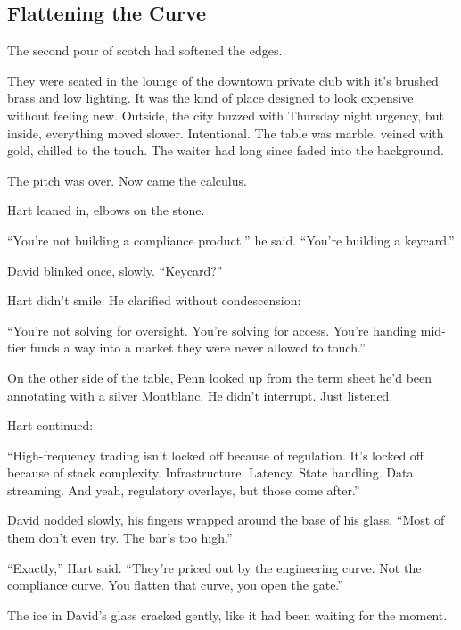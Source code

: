 
\subsection{Flattening the Curve}


The second pour of scotch had softened the edges.

They were seated in the lounge of the downtown private club with it's brushed brass and low lighting. It was the kind 
of place designed to look expensive without feeling new. Outside, the city buzzed with Thursday night urgency, but inside, 
everything moved slower. Intentional. The table was marble, veined with gold, chilled to the touch. The waiter had 
long since faded into the background.

The pitch was over. Now came the calculus.

Hart leaned in, elbows on the stone.

``You’re not building a compliance product,'' he said. ``You’re building a keycard.''

David blinked once, slowly. ``Keycard?''

Hart didn’t smile. He clarified without condescension:

``You’re not solving for oversight. You’re solving for access. You’re handing mid-tier funds a way into a market they were 
never allowed to touch.''

On the other side of the table, Penn looked up from the term sheet he’d been annotating with a silver Montblanc. He didn’t 
interrupt. Just listened.

Hart continued:

``High-frequency trading isn’t locked off because of regulation. It’s locked off because of stack complexity. 
Infrastructure. Latency. State handling. Data streaming. And yeah, regulatory overlays, but those come after.''

David nodded slowly, his fingers wrapped around the base of his glass. ``Most of them don’t even try. The bar’s too high.''

``Exactly,'' Hart said. ``They’re priced out by the engineering curve. Not the compliance curve. You flatten that curve, you 
open the gate.''

The ice in David’s glass cracked gently, like it had been waiting for the moment.


\medskip

